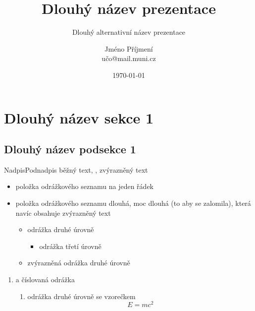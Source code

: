 \documentclass[
]{beamer}
\begin{document}
\title[Název prezentace]{Dlouhý název prezentace}
\subtitle[Alternativní název prezentace]{Dlouhý alternativní název prezentace}
\author[J.\,Příjmení]{Jméno Příjmení \\ učo@mail.muni.cz}
\date{\today}
\subject{Předmět prezentace}

\begin{frame}[plain]
\maketitle
\end{frame}

\section[Název sekce 1]{Dlouhý název sekce 1}
\subsection[Název podsekce 1]{Dlouhý název podsekce 1}

\begin{frame}{Nadpis}{Podnadpis}
běžný text, , \alert{zvýrazněný text}
\begin{itemize}
  \item položka odrážkového seznamu na jeden řádek
  \item položka odrážkového seznamu dlouhá, moc dlouhá (to aby se zalomila),
    která navíc obsahuje \alert{zvýrazněný text}
  \begin{itemize}
    \item odrážka druhé úrovně
    \begin{itemize}
      \item odrážka třetí úrovně
    \end{itemize}
    \item \alert{zvýrazněná odrážka druhé úrovně}
  \end{itemize}
\end{itemize}
\begin{enumerate}
  \item a číslovaná odrážka
  \begin{enumerate}
    \item odrážka druhé úrovně se vzorečkem
      \[ E = mc^2 \]
  \end{enumerate}
\end{enumerate}
\end{frame}
\end{document}
